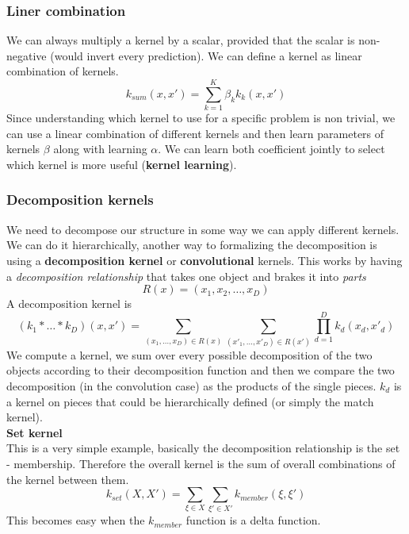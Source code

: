         \subsubsection{Liner combination}
            We can always multiply a kernel by a scalar, provided that the scalar is non-negative (would invert every prediction). We can define a kernel as linear combination of kernels. 
    		$$k_{sum}(x, x') = \sum_{k=1}^K\beta_k k_k(x,x')$$
            Since understanding which kernel to use for a specific problem is non trivial, we can use a linear combination of different kernels and then learn parameters of kernels $\beta$ along with learning $\alpha$. 
            We can learn both coefficient jointly to select which kernel is more useful (\textbf{kernel learning}). 

        \subsubsection{Decomposition kernels}
            We need to decompose our structure in some way we can apply different kernels. 
            We can do it hierarchically, another way to formalizing the decomposition is using a \textbf{decomposition kernel} or \textbf{convolutional} kernels. 
            This works by having a \textit{decomposition relationship} that takes one object and brakes it into \textit{parts} 
            $$R(x)= (x_1, x_2, \dots, x_D)$$
            A decomposition kernel is 
            $$(k_1 * \dots * k_D)(x, x') = 
                \sum _{(x_1, \dots, x_D) \in R(x)} \sum _{(x'_1, \dots, x'_D) \in R(x')} 
                \prod_{d=1} ^ D k_d(x_d, x'_d) $$
            We compute a kernel, we sum over every possible decomposition of the two objects according to their decomposition function and then we compare the two decomposition (in the convolution case) as the products of the single pieces. 
            $k_d$ is a kernel on pieces that could be hierarchically defined (or simply the match kernel).\\ 

            \textbf{Set kernel}\\
            This is a very simple example, basically the decomposition relationship is the set - membership. Therefore the overall kernel is the sum of overall combinations of the kernel between them. 
            $$k_{set} (X, X') = \sum _{\xi \in X} \sum _{\xi' \in X'} k_{member} (\xi, \xi')$$
            This becomes easy when the $k_{member}$ function is a delta function. 

